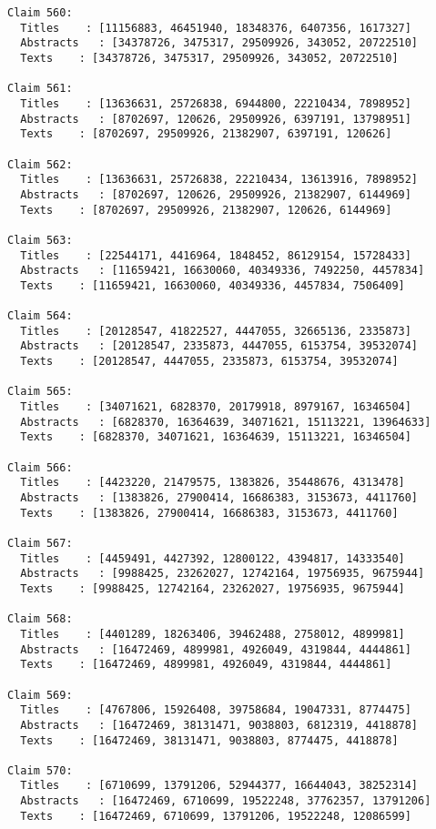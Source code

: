 \documentclass[11pt]{article}
\begin{document}
\begin{Verbatim}[commandchars=\\\{\}]
Claim 560:
  Titles    : [11156883, 46451940, 18348376, 6407356, 1617327]
  Abstracts   : [34378726, 3475317, 29509926, 343052, 20722510]
  Texts    : [34378726, 3475317, 29509926, 343052, 20722510]

Claim 561:
  Titles    : [13636631, 25726838, 6944800, 22210434, 7898952]
  Abstracts   : [8702697, 120626, 29509926, 6397191, 13798951]
  Texts    : [8702697, 29509926, 21382907, 6397191, 120626]

Claim 562:
  Titles    : [13636631, 25726838, 22210434, 13613916, 7898952]
  Abstracts   : [8702697, 120626, 29509926, 21382907, 6144969]
  Texts    : [8702697, 29509926, 21382907, 120626, 6144969]

Claim 563:
  Titles    : [22544171, 4416964, 1848452, 86129154, 15728433]
  Abstracts   : [11659421, 16630060, 40349336, 7492250, 4457834]
  Texts    : [11659421, 16630060, 40349336, 4457834, 7506409]

Claim 564:
  Titles    : [20128547, 41822527, 4447055, 32665136, 2335873]
  Abstracts   : [20128547, 2335873, 4447055, 6153754, 39532074]
  Texts    : [20128547, 4447055, 2335873, 6153754, 39532074]

Claim 565:
  Titles    : [34071621, 6828370, 20179918, 8979167, 16346504]
  Abstracts   : [6828370, 16364639, 34071621, 15113221, 13964633]
  Texts    : [6828370, 34071621, 16364639, 15113221, 16346504]

Claim 566:
  Titles    : [4423220, 21479575, 1383826, 35448676, 4313478]
  Abstracts   : [1383826, 27900414, 16686383, 3153673, 4411760]
  Texts    : [1383826, 27900414, 16686383, 3153673, 4411760]

Claim 567:
  Titles    : [4459491, 4427392, 12800122, 4394817, 14333540]
  Abstracts   : [9988425, 23262027, 12742164, 19756935, 9675944]
  Texts    : [9988425, 12742164, 23262027, 19756935, 9675944]

Claim 568:
  Titles    : [4401289, 18263406, 39462488, 2758012, 4899981]
  Abstracts   : [16472469, 4899981, 4926049, 4319844, 4444861]
  Texts    : [16472469, 4899981, 4926049, 4319844, 4444861]

Claim 569:
  Titles    : [4767806, 15926408, 39758684, 19047331, 8774475]
  Abstracts   : [16472469, 38131471, 9038803, 6812319, 4418878]
  Texts    : [16472469, 38131471, 9038803, 8774475, 4418878]

Claim 570:
  Titles    : [6710699, 13791206, 52944377, 16644043, 38252314]
  Abstracts   : [16472469, 6710699, 19522248, 37762357, 13791206]
  Texts    : [16472469, 6710699, 13791206, 19522248, 12086599]


\end{Verbatim}
\end{document}
